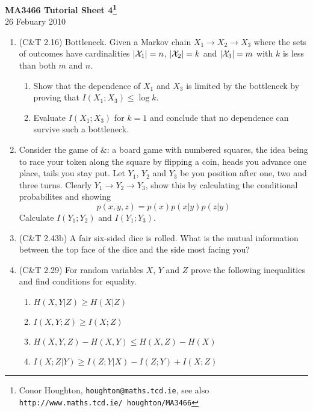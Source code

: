\documentclass[12pt]{article}
\begin{document}
\begin{center}
{\bf MA3466 Tutorial Sheet 4\footnote{Conor Houghton, {\tt houghton@maths.tcd.ie}, see also {\tt http://www.maths.tcd.ie/ houghton/MA3466}}}\\[1cm]{} 26 Febuary 2010
\end{center}
\begin{enumerate}

\item (C\&T 2.16) Bottleneck. Given a Markov chain $X_1\rightarrow X_2\rightarrow X_3$ where the sets of outcomes have cardinalities $|{\cal X}_1|=n$, $|{\cal X}_2|=k$ and $|{\cal X}_3|=m$ with $k$ is less than both $m$ and $n$. 
\begin{enumerate}
\item Show that the dependence of $X_1$ and $X_3$ is limited by the bottleneck by proving that $I(X_1;X_3)\le \log{k}$.
\item Evaluate $I(X_1;X_3)$ for $k=1$ and conclude that no dependence can survive such a bottleneck.
\end{enumerate}

\item Consider the game of $\&$\texttrademark: a board game with numbered squares, the idea being to race your token along the square by flipping a coin, heads you advance one place, tails you stay put. Let $Y_1$, $Y_2$ and $Y_3$ be you position after one, two and three turns. Clearly $Y_1\rightarrow Y_2 \rightarrow Y_3$, show this by calculating the conditional probabilites and showing
\begin{equation}
p(x,y,z)=p(x)p(x|y)p(z|y)
\end{equation}
Calculate $I(Y_1;Y_2)$ and $I(Y_1;Y_3)$.

\item (C\&T 2.43b) A fair six-sided dice is rolled. What is the mutual information between the top face of the dice and the side most facing you?

\item (C\&T 2.29) For random variables $X$, $Y$ and $Z$ prove the following inequalities and find conditions for equality.
\begin{enumerate}
\item $H(X,Y|Z)\ge H(X|Z)$
\item $I(X,Y;Z)\ge I(X;Z)$
\item $H(X,Y,Z)-H(X,Y)\le H(X,Z)-H(X)$
\item $I(X;Z|Y)\ge I(Z;Y|X)-I(Z;Y)+I(X;Z)$
\end{enumerate}

\end{enumerate}
\end{document}
